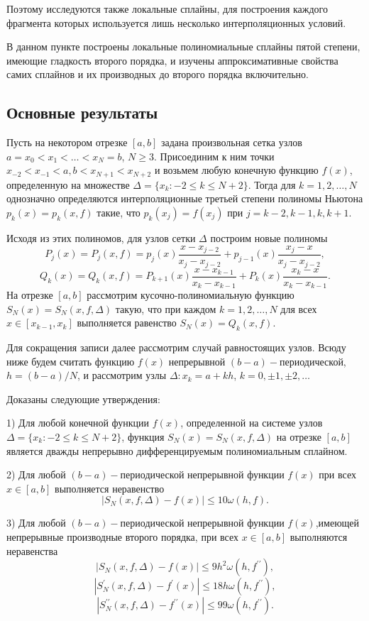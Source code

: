 Поэтому исследуются также локальные сплайны, для построения каждого фрагмента
которых используется лишь несколько интерполяционных условий.

В данном пункте построены локальные полиномиальные сплайны пятой степени,
имеющие гладкость второго порядка, и изучены аппроксимативные свойства самих
сплайнов и их производных до второго порядка включительно.


\subsection{Основные результаты}

Пусть на некотором отрезке $[a,b]$ задана произвольная сетка узлов
$a=x_0<x_1<\dots <x_N=b$,  $N\geqslant 3$. Присоединим к ним точки
$ x_{-2}<x_{-1}<a, b<x_{N+1}<x_{N+2}$ и возьмем любую конечную функцию $f(x)$,
определенную на множестве $\Delta=\{x_k: -2\leqslant k \leqslant N+2\}$.
Тогда для $k=1,2,\dots,N$ однозначно определяются интерполяционные третьей степени
 полиномы Ньютона $p_k (x)=p_k (x,f)$
такие, что  $p_k (x_j )=f(x_j)$ при $j=k-2,k-1,k,k+1$.

Исходя из этих полиномов, для узлов сетки $\Delta$ построим новые полиномы
$$
P_j (x)=P_j (x,f)=p_j (x) \frac{x-x_{j-2}}{x_j-x_{j-2}}+
p_{j-1}(x)\frac{x_j-x}{x_j-x_{j-2}},
$$
$$
Q_k (x)=Q_k (x,f)=P_{k+1}(x)\frac{x-x_{k-1}}{x_k-x_{k-1}}+
P_k (x)\frac{x_k-x}{x_k-x_{k-1}}.
$$
На отрезке $[a,b]$  рассмотрим кусочно-полиномиальную функцию
 $S_N (x)=S_N (x,f,\Delta)$ такую, что при каждом $k=1,2,\dots,N$
для всех $x\in [x_{k-1},x_k]$ выполняется равенство $S_N (x)=Q_k (x,f)$.

Для сокращения записи далее рассмотрим случай равностоящих узлов.
Всюду ниже будем считать функцию $f(x)$ непрерывной $(b-a)-$периодической,
$h=(b-a)/N$, и рассмотрим узлы $\Delta:x_k=a+kh$, $k=0,\pm 1,\pm 2,\dots$

Доказаны следующие утверждения:

1) Для любой конечной функции $f(x)$, определенной на системе узлов
$\Delta=\{x_k:-2\leqslant k \leqslant N+2\}$, функция
$S_N (x)=S_N (x,f,\Delta)$ на отрезке $[a,b]$
является дважды непрерывно дифференцируемым полиномиальным сплайном.

2) Для любой $(b-a)-$периодической непрерывной функции $f(x)$
при всех $x\in [a,b]$ выполняется неравенство
$$
|S_N (x,f,\Delta)-f(x)|\leqslant 10 \omega(h,f).
$$

3) Для любой $(b-a)-$периодической непрерывной функции $f(x)$,имеющей
непрерывные производные второго порядка, при всех $x\in [a,b]$ выполняются
неравенства
$$
|S_N (x,f,\Delta)-f(x)|\leqslant 9h^2 \omega(h,f^{\prime\prime}),
$$
$$
|S_N^\prime(x,f,\Delta)-f^\prime(x)|\leqslant 18h\omega(h,f^{\prime\prime}),
$$
$$
|S_N^{\prime\prime}(x,f,\Delta)-f^{\prime\prime}(x)|\leqslant 99\omega(h,f^{\prime\prime}).
$$



